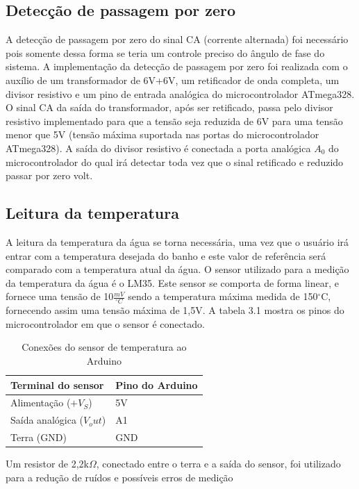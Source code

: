 \subsection{Detecção de passagem por zero}

A detecção de passagem por zero do sinal CA (corrente alternada) foi necessário pois somente dessa forma se teria um controle preciso do ângulo de fase do sistema. A implementação da detecção de passagem por zero foi realizada com o auxílio de um transformador de 6V+6V, um retificador de onda completa, um divisor resistivo e um pino de entrada analógica do microcontrolador ATmega328. O sinal CA da saída do transformador, após ser retificado, passa pelo divisor resistivo implementado para que a tensão seja reduzida de 6V para uma tensão menor que 5V (tensão máxima suportada nas portas do microcontrolador ATmega328). A saída do divisor resistivo é conectada a porta analógica $A_0$ do microcontrolador do qual irá detectar toda vez que o sinal retificado e reduzido passar por zero volt.

\subsection{Leitura da temperatura}
A leitura da temperatura da água se torna necessária, uma vez que o usuário irá entrar com a temperatura desejada do banho e este valor de referência será comparado com a temperatura atual da água. O sensor utilizado para a medição da temperatura da água é o LM35. Este sensor se comporta de forma linear, e fornece uma tensão de 10$\frac{mV}{^\circ C}$ sendo a temperatura máxima medida de 150$^\circ$C, fornecendo assim uma tensão máxima de 1,5V. A tabela 3.1 mostra os pinos do microcontrolador em que o sensor é conectado.

\begin{table}[!hbt] 
   \centering   %
   \setlength{\arrayrulewidth}{1\arrayrulewidth}
   \setlength{\belowcaptionskip}{5pt}
   
   \caption{Conexões do sensor de temperatura ao Arduino}
   \begin{tabular}{l|l} %
      \hline
      \textbf{Terminal do sensor} & \textbf{Pino do Arduino} \\
      \hline
      Alimentação ($+V_S$) &  5V  \\
      \hline
      Saída analógica ($V_out$)  & A1 \\
      \hline
      Terra (GND)	& GND \\
      \hline
   \end{tabular}
   \label{Conexões do sensor de temperatura ao Arduino}
\end{table}
Um resistor de 2,2k$\Omega$, conectado entre o terra e a saída do sensor, foi utilizado para a redução de ruídos e possíveis erros de medição

